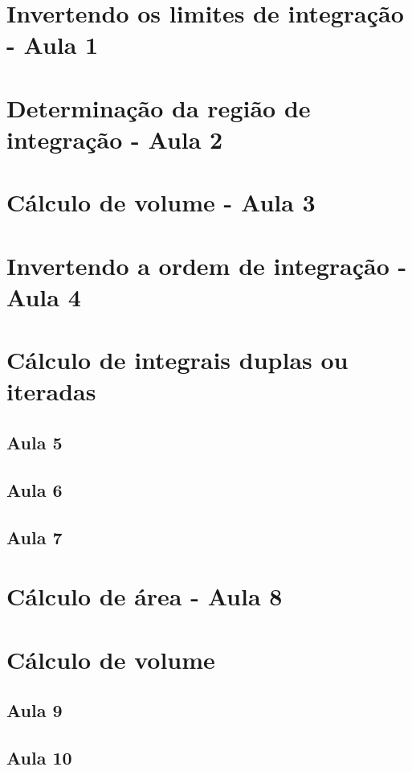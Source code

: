\documentclass[
12pt,				%
openright,			%
twoside,			%
a4paper,			%
english,			%
french,				%
spanish,			%
brazil,				%
]{abntex2}
\begin{document}
\section{Invertendo os limites de integração - Aula 1}			
			
\section{Determinação da região de integração - Aula 2}		
			
\section{Cálculo de volume - Aula 3}
			
\section{Invertendo a ordem de integração - Aula 4}
			
\section{Cálculo de integrais duplas ou iteradas}
	\subsection{Aula 5}
				
	\subsection{Aula 6}
				
	\subsection{Aula 7}
				
	\section{Cálculo de área - Aula 8}
				
	\section{Cálculo de volume}
		\subsection{Aula 9}
					
		\subsection{Aula 10}
				
\end{document}

